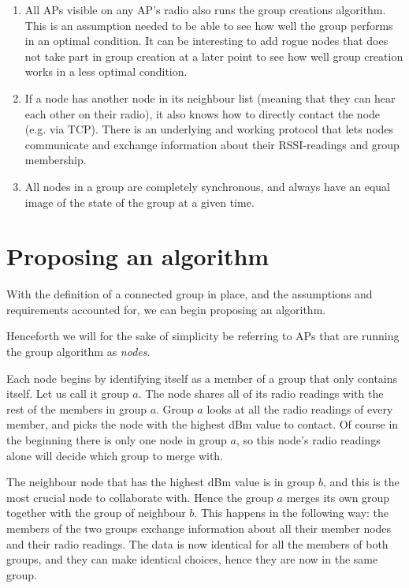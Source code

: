     \begin{enumerate}
    \item All APs visible on any AP's radio also runs the group creations algorithm. This is an assumption needed to be able to
	see how well the group performs in an optimal condition. It can be interesting to add rogue nodes that does not take part in group creation at a later point
	to see how well group creation works in a less optimal condition. 
    \item If a node has another node in its neighbour list (meaning that they can hear each other on their radio), it also knows how to directly contact the node (e.g. via TCP).
	 There is an underlying and working protocol that lets nodes communicate and exchange information about their RSSI-readings and group membership. 
    \item All nodes in a group are completely synchronous, and always have an equal image of the state of the group at a given time. 
    \end{enumerate}

\section{Proposing an algorithm}\label{algorithm}
With the definition of a connected group in place, and the assumptions and requirements accounted for, we can begin proposing an algorithm.

Henceforth we will for the sake of simplicity be referring to APs that are running the group algorithm as \textit{nodes}.

Each node begins by identifying itself as a member of a group that only contains itself. Let us call it group $a$. The node shares all of
its radio readings with the rest of the members in group $a$. Group $a$ looks at all the radio readings of every member, and picks the node with the highest dBm value
to contact. Of course in the beginning there is only one node in group $a$, so this node's radio readings alone will decide which group to merge with. 

The neighbour node that has the highest dBm value is in group $b$, and this is the most crucial node to collaborate with. Hence the group $a$ merges its own group together
with the group of neighbour $b$. This happens in the following way: the members of the two groups exchange information about all their member nodes and their radio readings.
The data is now identical for all the members of both groups, and they can make identical choices, hence they are now in the same group. 

